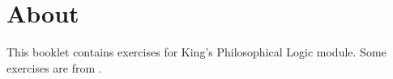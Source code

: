 \documentclass[../../../../include/open-logic-chapter]{subfiles}
\begin{document}
\chapter{About}

This booklet contains exercises for King's Philosophical Logic module.
Some exercises are from 
\citet{MacFarlane-2020-PhilosophicalLogicContemporary}.
\end{document}
